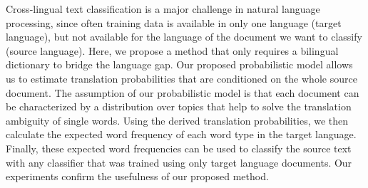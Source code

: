 Cross-lingual text classification is a major challenge in natural language processing, since often training data is available in only one language (target language), but not available for the language of the document we want to classify (source language). Here, we propose a method that only requires a bilingual dictionary to bridge the language gap. Our proposed probabilistic model allows us to estimate translation probabilities that are conditioned on the whole source document. The assumption of our probabilistic model is that each document can be characterized by a distribution over topics that help to solve the translation ambiguity of single words. Using the derived translation probabilities, we then calculate the expected word frequency of each word type in the target language. Finally, these expected word frequencies can be used to classify the source text with any classifier that was trained using only target language documents. Our experiments confirm the usefulness of our proposed method.
